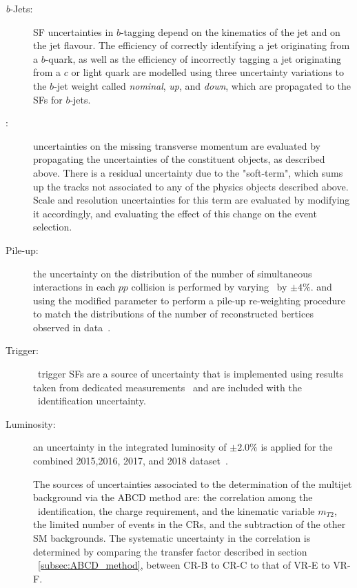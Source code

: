 \begin{description}
	\item[\textit{b}-Jets:] \ac{SF} uncertainties in $b$-tagging depend on the kinematics of the jet and on the jet flavour. The efficiency of correctly identifying a jet originating from a $b$-quark, as well as the efficiency of incorrectly tagging a jet originating from a $c$ or light quark are modelled using three uncertainty variations to the $b$-jet weight called \textit{nominal}, \textit{up}, and \textit{down}, which are propagated to the \acp{SF} for $b$-jets.
	\item[\boldmath \met:] uncertainties on the missing transverse momentum are evaluated by propagating the uncertainties of the constituent objects, as described above. There is a residual uncertainty due to the "soft-term", which sums up the tracks not associated to any of the physics objects described above. Scale and resolution uncertainties for this term are evaluated by modifying it accordingly, and evaluating the effect of this change on the event selection. 
	\item[Pile-up:] the uncertainty on  the distribution of the number of simultaneous interactions in each $pp$ collision is performed by varying \mubar\ by $\pm4\%$. and using the modified parameter to perform a pile-up re-weighting procedure to match the distributions of the number of reconstructed bertices observed in data~\cite{PhysRevLett.117.182002}.
	\item[Trigger:] \ltau\ trigger \acp{SF} are a source of uncertainty that is implemented using results taken from dedicated measurements~\cite{ATLAS-CONF-2017-061} and are included with the \ltau\ identification uncertainty.
	\item[Luminosity:] an uncertainty in the integrated luminosity of $\pm2.0\%$ is applied for the combined 2015,2016, 2017, and 2018 dataset~\cite{ATLAS-CONF-2019-021}.
	
	The sources of uncertainties associated to the determination of the multijet background via the ABCD method are: the correlation among the \ltau\ identification, the charge requirement, and the kinematic variable $m_{T2}$, the limited number of events in the \acp{CR}, and the subtraction of the other \ac{SM} backgrounds.
	The systematic uncertainty in the correlation is determined by comparing the transfer factor described in section ~\ref{subsec:ABCD_method}, between \ac{CR}-B to \ac{CR}-C to that of \ac{VR}-E to \ac{VR}-F.   
	

\end{description}
